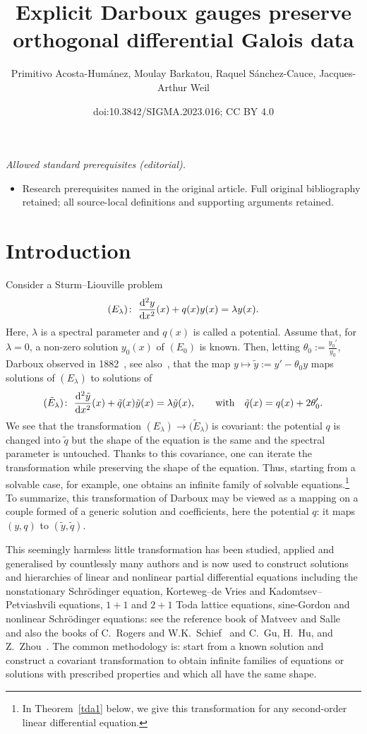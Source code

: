 \documentclass[10pt,a4paper]{amsart}
\title{Explicit Darboux gauges preserve orthogonal differential Galois data}
\author{Primitivo Acosta-Humánez, Moulay Barkatou, Raquel Sánchez-Cauce, Jacques-Arthur Weil}
\date{doi:10.3842/SIGMA.2023.016; CC BY 4.0}
\numberwithin{equation}{section}
\begin{document}
\maketitle
\noindent\textit{Allowed standard prerequisites (editorial).}\begin{itemize}
\item Research prerequisites named in the original article. Full original bibliography retained; all source-local definitions and supporting arguments retained.
\end{itemize}\medskip
\section{Introduction}
Consider a Sturm--Liouville problem
\begin{gather*}
(E_{\lambda}) \colon \ \frac{{\rm d}^2 y}{{\rm d}x^2}(x)+ q(x) y(x) = \lambda y(x).
\end{gather*}
Here, $ \lambda$ is a spectral parameter
and $q(x)$ is called a potential. Assume that, for $\lambda=0$, a non-zero solution $y_0(x)$ of $(E_0)$ is known.
Then, letting $\theta_0:=\frac{y_0'}{y_0}$, Darboux observed in 1882~\cite{da1}, see also~\cite{da,da2}, that the map $y\mapsto \tilde{y}:= y'-\theta_0 y$
maps solutions of $(E_{\lambda})$ to solutions of
\begin{gather*}
(\tilde{E}_{\lambda})\colon\ \frac{{\rm d}^2\tilde{y}}{{\rm d}x^2}(x) + \tilde{q}(x) \tilde{y}(x) = \lambda \tilde{y}(x),\qquad
	\textrm{with}\quad \tilde{q}(x) = q(x) + 2 \theta_0'.
\end{gather*}
We see that the transformation $({E}_{\lambda})\rightarrow \big(\tilde{E}_{\lambda}\big)$ is covariant: the potential $q$ is changed into $\tilde{q}$ but the shape of the equation is the same and the spectral parameter is untouched. Thanks to this covariance, one can iterate the transformation while preserving the shape of the equation. Thus, starting from a solvable case, for example, one obtains an infinite family of solvable equations.\footnote{In Theorem~\ref{tda1} below, we give this transformation for any second-order linear differential equation.}
To summarize, this transformation of Darboux may be viewed as a mapping on a couple formed of a generic solution and coefficients, here the potential $q$: it maps $(y,q)$ to $(\tilde{y},\tilde{q})$.

This seemingly harmless little transformation has been studied, applied and generalised by countlessly many authors and is now used to construct solutions and hierarchies of linear and nonlinear partial differential equations including the nonstationary Schr\"odinger equation, Korteweg--de Vries
and Kadomtsev--Petviashvili equations, $1 + 1$ and $2+1$ Toda lattice equations,
sine-Gordon and nonlinear Schr\"odinger equations: see the reference book of Matveev and Salle~\cite{MaSa91a} and also the books of
C.~Rogers and W.K.~Schief~\cite{RoSc02h} and C.~Gu, H.~Hu, and Z.~Zhou~\cite{GHZ}.
The common methodology is: start from a known solution and construct a covariant transformation to obtain infinite families of equations or solutions with prescribed properties and which all have the same shape.
\end{document}
